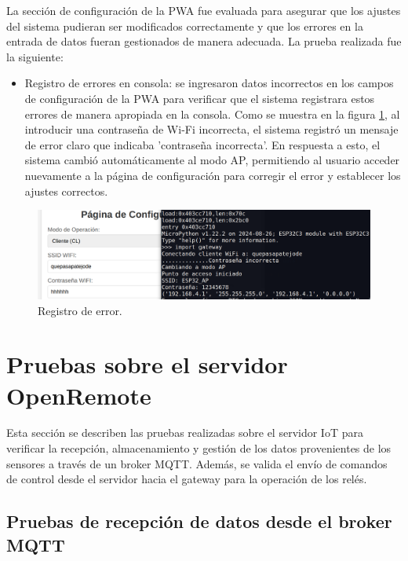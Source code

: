La sección de configuración de la PWA fue evaluada para asegurar que los ajustes del sistema pudieran ser modificados correctamente y que los errores en la entrada de datos fueran gestionados de manera adecuada. La prueba realizada fue la siguiente:

\begin{itemize}
    \item Registro de errores en consola: se ingresaron datos incorrectos en los campos de configuración de la PWA para verificar que el sistema registrara estos errores de manera apropiada en la consola. Como se muestra en la figura \ref{fig:pwa_conf}, al introducir una contraseña de Wi-Fi incorrecta, el sistema registró un mensaje de error claro que indicaba 'contraseña incorrecta'. En respuesta a esto, el sistema cambió automáticamente al modo AP, permitiendo al usuario acceder nuevamente a la página de configuración para corregir el error y establecer los ajustes correctos.
\end{itemize}

\begin{figure}[H]
\centering 
\includegraphics[width=1\textwidth]{./Figures/pwa_conf.png}
\caption{Registro de error.}
\label{fig:pwa_conf}
\end{figure}





\section{Pruebas sobre el servidor OpenRemote}

Esta sección se describen las pruebas realizadas sobre el servidor IoT para verificar la recepción, almacenamiento y gestión de los datos provenientes de los sensores a través de un broker MQTT. Además, se valida el envío de comandos de control desde el servidor hacia el gateway para la operación de los relés.


\subsection{Pruebas de recepción de datos desde el broker MQTT}

